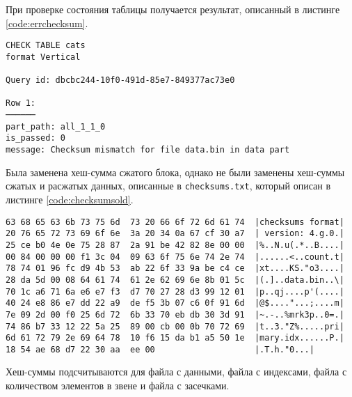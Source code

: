 При проверке состояния таблицы получается результат, описанный в листинге \ref{code:errchecksum}.

\begin{lstlisting}[label=code:errchecksum, caption={Результат проверки.}]
CHECK TABLE cats
format Vertical

Query id: dbcbc244-10f0-491d-85e7-849377ac73e0

Row 1:
──────
part_path: all_1_1_0
is_passed: 0
message: Checksum mismatch for file data.bin in data part
\end{lstlisting}

Была заменена хеш-сумма сжатого блока, однако не были заменены хеш-суммы сжатых и расжатых данных, описанные в \texttt{checksums.txt}, который описан в листинге \ref{code:checksumsold}.

\begin{lstlisting}[label=code:checksumsold, caption={Хеш-суммы, описанные в файле \texttt{checksums.txt}.}]
63 68 65 63 6b 73 75 6d  73 20 66 6f 72 6d 61 74  |checksums format|
20 76 65 72 73 69 6f 6e  3a 20 34 0a 67 cf 30 a7  | version: 4.g.0.|
25 ce b0 4e 0e 75 28 87  2a 91 be 42 82 8e 00 00  |%..N.u(.*..B....|
00 84 00 00 00 f1 3c 04  09 63 6f 75 6e 74 2e 74  |......<..count.t|
78 74 01 96 fc d9 4b 53  ab 22 6f 33 9a be c4 ce  |xt....KS."o3....|
28 da 5d 00 08 64 61 74  61 2e 62 69 6e 8b 01 5c  |(.]..data.bin..\|
70 1c a6 71 6a e6 e7 f3  d7 70 27 28 d3 99 12 01  |p..qj....p'(....|
40 24 e8 86 e7 dd 22 a9  de f5 3b 07 c6 0f 91 6d  |@$...."...;....m|
7e 09 2d 00 f0 25 6d 72  6b 33 70 eb db 30 3d 91  |~.-..%mrk3p..0=.|
74 86 b7 33 12 22 5a 25  89 00 cb 00 0b 70 72 69  |t..3."Z%.....pri|
6d 61 72 79 2e 69 64 78  10 f6 15 da b1 a5 50 1e  |mary.idx......P.|
18 54 ae 68 d7 22 30 aa  ee 00                    |.T.h."0...|
\end{lstlisting}

Хеш-суммы подсчитываются для файла с данными, файла с индексами, файла с количеством элементов в звене и файла с засечками.


